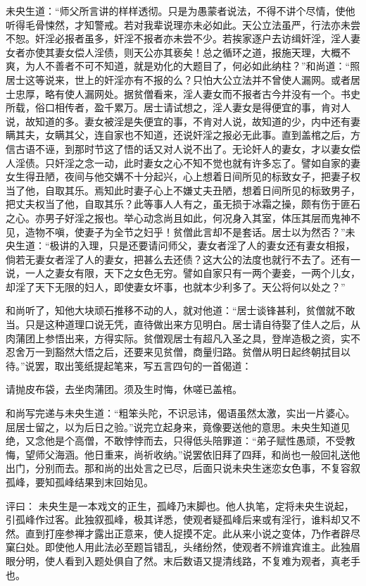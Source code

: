 \documentclass[a4paper,12pt,UTF8,twoside]{ctexbook}
\begin{document}
未央生道：“师父所言讲的样样透彻。只是为愚蒙者说法，不得不讲个尽情，使他听得毛骨悚然，才知警戒。若对我辈说理亦未必如此。天公立法虽严，行法亦未尝不恕。奸淫必报者虽多，奸淫不报者亦未尝不少。若挨家逐户去访缉奸淫，淫人妻女者亦使其妻女偿人淫债，则天公亦其亵矣！总之循环之道，报施天理，大概不爽，为人不善者不可不知道，就是劝化的大题目了，何必如此纳柱？”和尚道：“照居士这等说来，世上的奸淫亦有不报的么？只怕大公立法并不曾使人漏网。或者居士忠厚，略有使人漏网处。据贫僧看来，淫人妻女而不报者古今并没有一个。书史所载，俗口相传者，盈千累万。居士请试想之，淫人妻女是得便宜的事，肯对人说，故知道的多。妻女被淫是失便宜的事，不肯对人说，故知道的少，内中还有妻瞒其夫，女瞒其父，连自家也不知道，还说奸淫之报必无此事。直到盖棺之后，方信古语不诬，到那时节这了悟的话又对人说不出了。无论奸人的妻女，才以妻女偿人淫债。只奸淫之念一动，此时妻女之心不知不觉也就有许多忘了。譬如自家的妻女生得丑陋，夜间与他交媾不十分起兴，心上想着日间所见的标致女子，把妻子权当了他，自取其乐。焉知此时妻子心上不嫌丈夫丑陋，想着日间所见的标致男子，把丈夫权当了他，自取其乐？此等事人人有之，虽无损于冰霜之操，颇有伤于匪石之心。亦男子好淫之报也。举心动念尚且如此，何况身入其室，体压其层而鬼神不见，造物不嗔，使妻子为全节之妇乎！贫僧此言却不是套话。居士以为然否？”未央生道：“极讲的入理，只是还要请问师父，妻女者淫了人的妻女还有妻女相报，倘若无妻女者淫了人的妻女，把甚么去还债？这大公的法度也就行不去了。还有一说，一人之妻女有限，天下之女色无穷。譬如自家只有一两个妻妾，一两个儿女，却淫了天下无限的妇人，即使妻女坏事，也就本少利多了。天公将何以处之？”

和尚听了，知他大块顽石推移不动的人，就对他道：“居士谈锋甚利，贫僧就不敢当。只是这种道理口说无凭，直待做出来方见明白。居士请自待娶了佳人之后，从肉蒲团上参悟出来，方得实际。贫僧观居士有超凡入圣之具，登岸造极之资，实不忍舍万一到豁然大悟之后，还要来见贫僧，商量归路。贫僧从明日起终朝拭目以待。”说罢，取出笺纸提起笔来，写五言四句的一首偈道：

请抛皮布袋，去坐肉蒲团。须及生时悔，休嗟已盖棺。

和尚写完递与未央生道：“粗笨头陀，不识忌讳，偈语虽然太激，实出一片婆心。屈居士留之，以为后日之验。”说完立起身来，竟像要送他的意思。未央生知道见绝，又念他是个高僧，不敢悖悖而去，只得低头陪罪道：“弟子赋性愚顽，不受教悔，望师父海涵。他日重来，尚祈收纳。”说罢依旧拜了四拜，和尚也一般回礼送他出门，分别而去。那和尚的出处言之已尽，后面只说未央生迷恋女色事，不复容叙孤峰，要知孤峰结果到末回始见。

评曰： 未央生是一本戏文的正生，孤峰乃末脚也。他人执笔，定将未央生说起，引孤峰作过客。此独叙孤峰，极其详悉，使观者疑孤峰后来或有淫行，谁料却又不然。直到打座参禅才露出正意来，使人捉摸不定。此从来小说之变体，乃作者辟尽窠臼处。即使他人用此法必至题旨错乱，头绪纷然，使观者不辨谁宾谁主。此独眉眼分明，使人看到入题处俱自了然。末后数语又提清线路，不复难为观者，真老手也。
\end{document}
